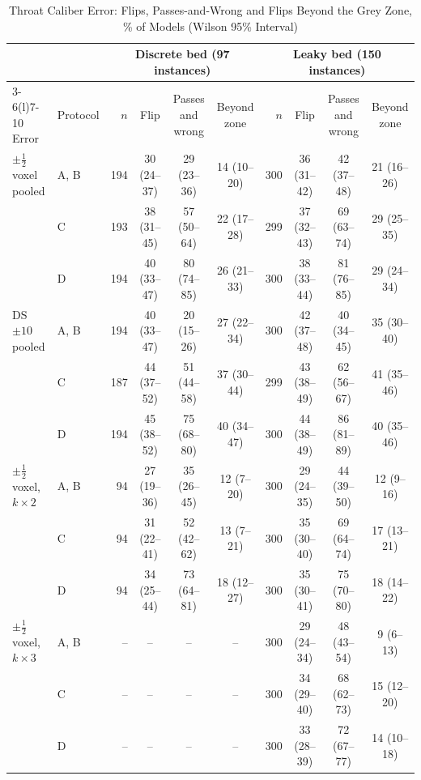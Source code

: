 \documentclass[journal,twoside,web,onecolumn]{ieeecolor}
\begin{document}
\begin{table}[!ht]
\caption{Throat Caliber Error: Flips, Passes-and-Wrong and Flips Beyond the Grey Zone, \% of Models (Wilson 95\% Interval)}\label{tab:throat}
\centering\footnotesize\setlength{\tabcolsep}{3pt}
\begin{tabular}{@{}llrccc rccc@{}}
\toprule
 & & \multicolumn{4}{c}{Discrete bed (97 instances)} & \multicolumn{4}{c}{Leaky bed (150 instances)}\\
\cmidrule(lr){3-6}\cmidrule(l){7-10}
Error & Protocol & $n$ & Flip & Passes and wrong & Beyond zone & $n$ & Flip & Passes and wrong & Beyond zone\\
\midrule
$\pm\tfrac12$ voxel pooled & A, B & 194 & 30 (24--37) & 29 (23--36) & 14 (10--20) & 300 & 36 (31--42) & 42 (37--48) & 21 (16--26) \\
 & C & 193 & 38 (31--45) & 57 (50--64) & 22 (17--28) & 299 & 37 (32--43) & 69 (63--74) & 29 (25--35) \\
 & D & 194 & 40 (33--47) & 80 (74--85) & 26 (21--33) & 300 & 38 (33--44) & 81 (76--85) & 29 (24--34) \\
\addlinespace[2pt]
DS $\pm10$ pooled & A, B & 194 & 40 (33--47) & 20 (15--26) & 27 (22--34) & 300 & 42 (37--48) & 40 (34--45) & 35 (30--40) \\
 & C & 187 & 44 (37--52) & 51 (44--58) & 37 (30--44) & 299 & 43 (38--49) & 62 (56--67) & 41 (35--46) \\
 & D & 194 & 45 (38--52) & 75 (68--80) & 40 (34--47) & 300 & 44 (38--49) & 86 (81--89) & 40 (35--46) \\
$\pm\tfrac12$ voxel, $k\times2$ & A, B & 94 & 27 (19--36) & 35 (26--45) & 12 (7--20) & 300 & 29 (24--35) & 44 (39--50) & 12 (9--16) \\
 & C & 94 & 31 (22--41) & 52 (42--62) & 13 (7--21) & 300 & 35 (30--40) & 69 (64--74) & 17 (13--21) \\
 & D & 94 & 34 (25--44) & 73 (64--81) & 18 (12--27) & 300 & 35 (30--41) & 75 (70--80) & 18 (14--22) \\
\addlinespace[2pt]
$\pm\tfrac12$ voxel, $k\times3$ & A, B & -- & -- & -- & -- & 300 & 29 (24--34) & 48 (43--54) & 9 (6--13) \\
 & C & -- & -- & -- & -- & 300 & 34 (29--40) & 68 (62--73) & 15 (12--20) \\
 & D & -- & -- & -- & -- & 300 & 33 (28--39) & 72 (67--77) & 14 (10--18) \\
\bottomrule
\end{tabular}
\\[3pt]

\end{table}
\end{document}
